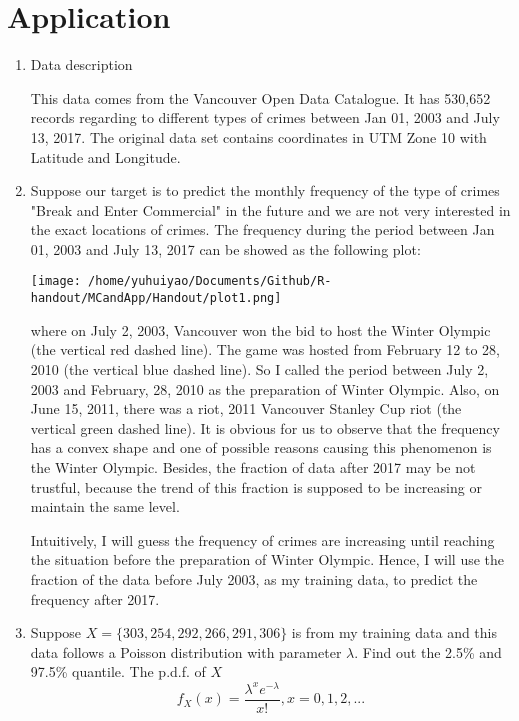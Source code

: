 \section{Application}
\begin{enumerate}
	\item Data description\cite{civ17}
	\par This data comes from the Vancouver Open Data Catalogue. It has 530,652 records regarding to different types of crimes between Jan 01, 2003 and July 13, 2017. The original data set contains coordinates in UTM Zone 10 with Latitude and Longitude. 
	\item Suppose our target is to predict the monthly frequency of the type of crimes "Break and Enter Commercial" in the future and we are not very interested in the exact locations of crimes. The frequency during the period between Jan 01, 2003 and July 13, 2017 can be showed as the following plot:
	\begin{center}
		\texttt{[image: /home/yuhuiyao/Documents/Github/R-handout/MCandApp/Handout/plot1.png]}
	\end{center}
	where on July 2, 2003, Vancouver won the bid to host the Winter Olympic (the vertical red dashed line). The game was hosted from February 12 to 28, 2010 (the vertical blue dashed line). So I called the period between July 2, 2003 and February, 28, 2010 as the preparation of Winter Olympic. Also, on June 15, 2011, there was a riot, 2011 Vancouver Stanley Cup riot (the vertical green dashed line). It is obvious for us to observe that the frequency has a convex shape and one of possible reasons causing this phenomenon is the Winter Olympic. Besides, the fraction of data after 2017 may be not trustful, because the trend of this fraction is supposed to be increasing or maintain the same level.
	\par Intuitively, I will guess the frequency of crimes are increasing until reaching the situation before the preparation of Winter Olympic. Hence, I will use the fraction of the data before July 2003, as my training data, to predict the frequency after 2017.
	\item
	\par Suppose $X = \{303, 254, 292, 266, 291, 306\}$ is from my training data and this data follows a Poisson distribution with parameter $\lambda$. Find out the 2.5\% and 97.5\% quantile. The p.d.f. of $X$
	\begin{equation*}
		f_X(x) = \frac{\lambda^{x}e^{-\lambda}}{x!} , x = 0, 1, 2, ...
	\end{equation*}

\end{enumerate}

